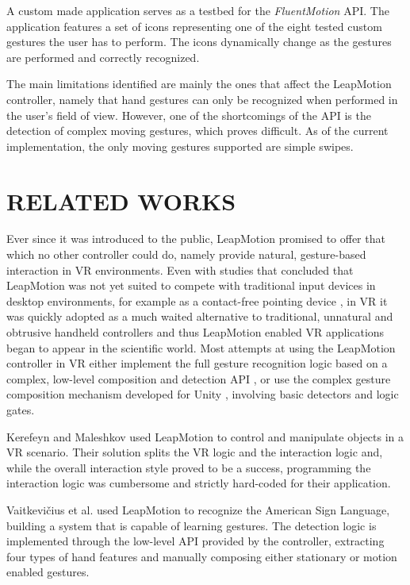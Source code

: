 \documentclass[chi_draft]{sigchi}
\def\fluentmotion{\textit{FluentMotion}}
\def\leap{LeapMotion}
\begin{document}
A custom made application serves as a testbed for the \fluentmotion{} API. The application features a set of icons representing one of the eight tested custom gestures the user has to perform. The icons dynamically change as the gestures are performed and correctly recognized.

The main limitations identified are mainly the ones that affect the \leap{} controller, namely that hand gestures  can only be recognized when performed in the user's field of view. However, one of the shortcomings of the API is the detection of complex moving gestures, which proves difficult. As of the current implementation, the only moving gestures supported are simple swipes.

\section{RELATED WORKS}

Ever since it was introduced to the public, \leap{} promised to offer that which no other controller could do, namely provide natural, gesture-based interaction in VR environments. Even with studies that concluded that \leap{} was not yet suited to compete with traditional input devices in desktop environments, for example as a contact-free pointing device \cite{3149}, in VR it was quickly adopted as a much waited alternative to traditional, unnatural and obtrusive handheld controllers and thus \leap{} enabled VR applications began to appear in the scientific world. Most attempts at using the \leap{} controller in VR either implement the full gesture recognition logic based on a complex, low-level composition and detection API \cite{LMAPI}, or use the complex gesture composition mechanism developed for Unity \cite{LMUAPI}, involving basic detectors and logic gates. 

Kerefeyn and Maleshkov \cite{Kerefeyn} used \leap{} to control and manipulate objects in a VR scenario. Their solution splits the VR logic and the interaction logic and, while the overall interaction style proved to be a success, programming the interaction logic was cumbersome and strictly hard-coded for their application.

Vaitkevi\v{c}ius et al. \cite{Vaitkevicius} used \leap{} to recognize the American Sign Language, building a system that is capable of learning gestures. The detection logic is implemented through the low-level API provided by the controller, extracting four types of hand features and manually composing either stationary or motion enabled gestures.
\end{document}
